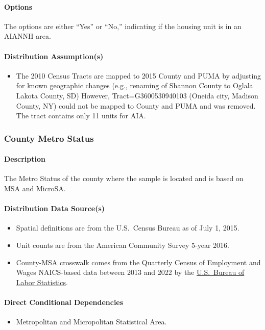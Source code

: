 \paragraph{Options}
The options are either ``Yes'' or ``No,'' indicating if the housing unit is in an AIANNH area.

\paragraph{Distribution Assumption(s)}
\begin{itemize}
    \item The 2010 Census Tracts are mapped to 2015 County and PUMA by adjusting for known geographic changes (e.g., renaming of Shannon County to Oglala Lakota County, SD) However, Tract=G3600530940103 (Oneida city, Madison County, NY) could not be mapped to County and PUMA and was removed. The tract contains only 11 units for AIA.
\end{itemize}

\subsubsection{County Metro Status}
\paragraph{Description}
The Metro Status of the county where the sample is located and is based on MSA and MicroSA.

\paragraph{Distribution Data Source(s)}
\begin{itemize}
    \item Spatial definitions are from the U.S.~Census Bureau as of July 1, 2015.
    \item Unit counts are from the American Community Survey 5-year 2016.
    \item County-MSA crosswalk comes from the Quarterly Census of Employment and Wages NAICS-based data between 2013 and 2022 by the  \href{https://www.bls.gov/cew/classifications/areas/county-msa-csa-crosswalk.htm}{U.S.~Bureau of Labor Statistics}.
\end{itemize}

\paragraph{Direct Conditional Dependencies}
\begin{itemize}
    \item Metropolitan and Micropolitan Statistical Area.
\end{itemize}

